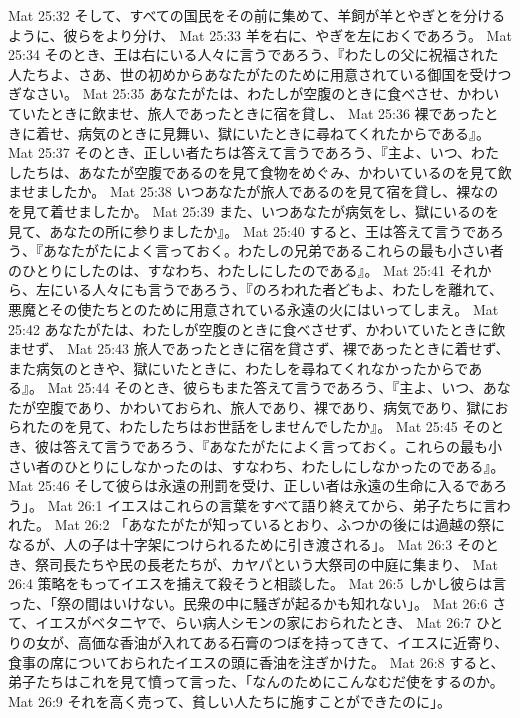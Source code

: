 Mat 25:32  そして、すべての国民をその前に集めて、羊飼が羊とやぎとを分けるように、彼らをより分け、
Mat 25:33  羊を右に、やぎを左におくであろう。
Mat 25:34  そのとき、王は右にいる人々に言うであろう、『わたしの父に祝福された人たちよ、さあ、世の初めからあなたがたのために用意されている御国を受けつぎなさい。
Mat 25:35  あなたがたは、わたしが空腹のときに食べさせ、かわいていたときに飲ませ、旅人であったときに宿を貸し、
Mat 25:36  裸であったときに着せ、病気のときに見舞い、獄にいたときに尋ねてくれたからである』。
Mat 25:37  そのとき、正しい者たちは答えて言うであろう、『主よ、いつ、わたしたちは、あなたが空腹であるのを見て食物をめぐみ、かわいているのを見て飲ませましたか。
Mat 25:38  いつあなたが旅人であるのを見て宿を貸し、裸なのを見て着せましたか。
Mat 25:39  また、いつあなたが病気をし、獄にいるのを見て、あなたの所に参りましたか』。
Mat 25:40  すると、王は答えて言うであろう、『あなたがたによく言っておく。わたしの兄弟であるこれらの最も小さい者のひとりにしたのは、すなわち、わたしにしたのである』。
Mat 25:41  それから、左にいる人々にも言うであろう、『のろわれた者どもよ、わたしを離れて、悪魔とその使たちとのために用意されている永遠の火にはいってしまえ。
Mat 25:42  あなたがたは、わたしが空腹のときに食べさせず、かわいていたときに飲ませず、
Mat 25:43  旅人であったときに宿を貸さず、裸であったときに着せず、また病気のときや、獄にいたときに、わたしを尋ねてくれなかったからである』。
Mat 25:44  そのとき、彼らもまた答えて言うであろう、『主よ、いつ、あなたが空腹であり、かわいておられ、旅人であり、裸であり、病気であり、獄におられたのを見て、わたしたちはお世話をしませんでしたか』。
Mat 25:45  そのとき、彼は答えて言うであろう、『あなたがたによく言っておく。これらの最も小さい者のひとりにしなかったのは、すなわち、わたしにしなかったのである』。
Mat 25:46  そして彼らは永遠の刑罰を受け、正しい者は永遠の生命に入るであろう」。
Mat 26:1  イエスはこれらの言葉をすべて語り終えてから、弟子たちに言われた。
Mat 26:2  「あなたがたが知っているとおり、ふつかの後には過越の祭になるが、人の子は十字架につけられるために引き渡される」。
Mat 26:3  そのとき、祭司長たちや民の長老たちが、カヤパという大祭司の中庭に集まり、
Mat 26:4  策略をもってイエスを捕えて殺そうと相談した。
Mat 26:5  しかし彼らは言った、「祭の間はいけない。民衆の中に騒ぎが起るかも知れない」。
Mat 26:6  さて、イエスがベタニヤで、らい病人シモンの家におられたとき、
Mat 26:7  ひとりの女が、高価な香油が入れてある石膏のつぼを持ってきて、イエスに近寄り、食事の席についておられたイエスの頭に香油を注ぎかけた。
Mat 26:8  すると、弟子たちはこれを見て憤って言った、「なんのためにこんなむだ使をするのか。
Mat 26:9  それを高く売って、貧しい人たちに施すことができたのに」。
